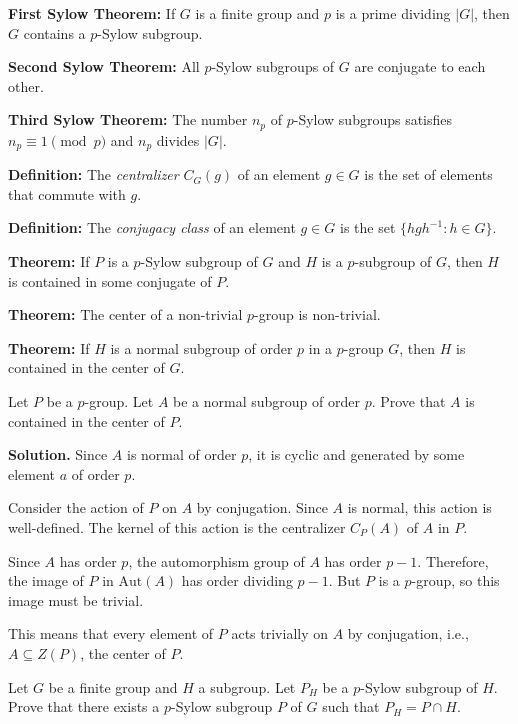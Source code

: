 \textbf{First Sylow Theorem:} If $G$ is a finite group and $p$ is a prime dividing $|G|$, then $G$ contains a $p$-Sylow subgroup.

\textbf{Second Sylow Theorem:} All $p$-Sylow subgroups of $G$ are conjugate to each other.

\textbf{Third Sylow Theorem:} The number $n_p$ of $p$-Sylow subgroups satisfies $n_p \equiv 1 \pmod{p}$ and $n_p$ divides $|G|$.

\textbf{Definition:} The \textit{centralizer} $C_G(g)$ of an element $g \in G$ is the set of elements that commute with $g$.

\textbf{Definition:} The \textit{conjugacy class} of an element $g \in G$ is the set $\{hgh^{-1} : h \in G\}$.

\textbf{Theorem:} If $P$ is a $p$-Sylow subgroup of $G$ and $H$ is a $p$-subgroup of $G$, then $H$ is contained in some conjugate of $P$.

\textbf{Theorem:} The center of a non-trivial $p$-group is non-trivial.

\textbf{Theorem:} If $H$ is a normal subgroup of order $p$ in a $p$-group $G$, then $H$ is contained in the center of $G$.

\begin{problembox}
Let $P$ be a $p$-group. Let $A$ be a normal subgroup of order $p$. Prove that $A$ is contained in the center of $P$.
\end{problembox}

\noindent\textbf{Solution.} Since $A$ is normal of order $p$, it is cyclic and generated by some element $a$ of order $p$. 

Consider the action of $P$ on $A$ by conjugation. Since $A$ is normal, this action is well-defined. The kernel of this action is the centralizer $C_P(A)$ of $A$ in $P$.

Since $A$ has order $p$, the automorphism group of $A$ has order $p-1$. Therefore, the image of $P$ in $\text{Aut}(A)$ has order dividing $p-1$. But $P$ is a $p$-group, so this image must be trivial.

This means that every element of $P$ acts trivially on $A$ by conjugation, i.e., $A \subseteq Z(P)$, the center of $P$.

\begin{problembox}
Let $G$ be a finite group and $H$ a subgroup. Let $P_H$ be a $p$-Sylow subgroup of $H$. Prove that there exists a $p$-Sylow subgroup $P$ of $G$ such that $P_H = P \cap H$.
\end{problembox}

